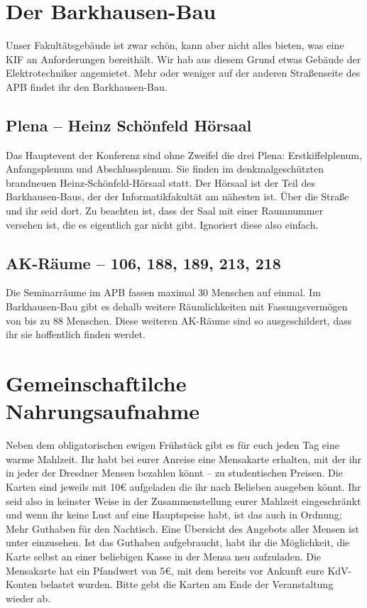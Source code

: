 \pagebreak

\section*{Der Barkhausen-Bau}
Unser Fakultätsgebäude ist zwar schön, kann aber nicht alles bieten, was eine KIF an Anforderungen bereithält.
Wir hab aus diesem Grund etwas Gebäude der Elektrotechniker angemietet.
Mehr oder weniger auf der anderen Straßenseite des APB findet ihr den Barkhausen-Bau.

\subsection*{Plena -- Heinz Schönfeld Hörsaal}
Das Hauptevent der Konferenz sind ohne Zweifel die drei Plena: Erstkiffelplenum, Anfangsplenum und Abschlussplenum.
Sie finden im denkmalgeschützten brandneuen Heinz-Schönfeld-Hörsaal statt.
Der Hörsaal ist der Teil des Barkhausen-Baus, der der Informatikfakultät am nähesten ist.
Über die Straße und ihr seid dort.
Zu beachten ist, dass der Saal mit einer Raumnummer versehen ist, die es eigentlich gar nicht gibt.
Ignoriert diese also einfach.

\subsection*{AK-Räume -- 106, 188, 189, 213, 218}
Die Seminarräume im APB fassen maximal 30 Menschen auf einmal.
Im Barkhausen-Bau gibt es dehalb weitere Räumlichkeiten mit Fassungsvermögen von bis zu 88 Menschen.
Diese weiteren AK-Räume sind so ausgeschildert, dass ihr sie hoffentlich finden werdet.

\section*{Gemeinschaftilche Nahrungsaufnahme}
Neben dem obligatorischen ewigen Frühstück gibt es für euch jeden Tag eine warme Mahlzeit.
Ihr habt bei eurer Anreise eine Mensakarte erhalten, mit der ihr in jeder der Dresdner Mensen bezahlen könnt -- zu studentischen Preisen.
Die Karten sind jeweils mit 10€ aufgeladen die ihr nach Belieben ausgeben könnt.
Ihr seid also in keinster Weise in der Zusammenstellung eurer Mahlzeit eingeschränkt und wenn ihr keine Lust auf eine Hauptspeise habt, ist das auch in Ordnung; Mehr Guthaben für den Nachtisch.
Eine Übersicht des Angebots aller Mensen ist unter  einzusehen.
Ist das Guthaben aufgebraucht, habt ihr die Möglichkeit, die Karte selbst an einer beliebigen Kasse in der Mensa neu aufzuladen.
Die Mensakarte hat ein Pfandwert von 5€, mit dem bereits vor Ankunft eure KdV-Konten belastet wurden.
Bitte gebt die Karten am Ende der Veranstaltung wieder ab.

